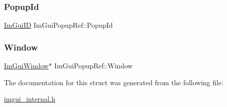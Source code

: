 \subsubsection{\texorpdfstring{Popup\+Id}{PopupId}}
{\footnotesize\ttfamily \mbox{\hyperlink{imgui_8h_a1785c9b6f4e16406764a85f32582236f}{Im\+Gui\+ID}} Im\+Gui\+Popup\+Ref\+::\+Popup\+Id}

\mbox{\label{struct_im_gui_popup_ref_a471027209038d1d59280a84c8d236f34}} 
\subsubsection{\texorpdfstring{Window}{Window}}
{\footnotesize\ttfamily \mbox{\hyperlink{struct_im_gui_window}{Im\+Gui\+Window}}$\ast$ Im\+Gui\+Popup\+Ref\+::\+Window}



The documentation for this struct was generated from the following file\+:\begin{DoxyCompactItemize}
\item 
\mbox{\hyperlink{imgui__internal_8h}{imgui\+\_\+internal.\+h}}\end{DoxyCompactItemize}
